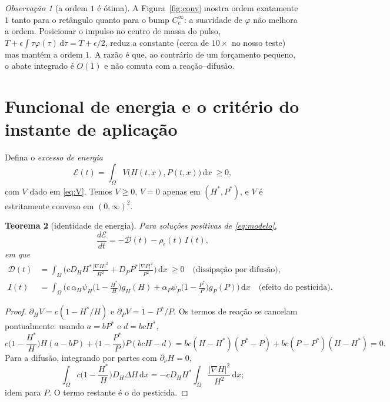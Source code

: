 \documentclass[11pt,a4paper]{article}
\numberwithin{equation}{section}
\newtheorem{teorema}{Teorema}[section]
\theoremstyle{definition}
\theoremstyle{remark}
\newtheorem{observacao}[teorema]{Observação}
\newcommand{\E}{\mathcal{E}}
\newcommand{\dd}{\,\mathrm{d}}
\newcommand{\Hs}{H^{*}}
\newcommand{\Ps}{P^{*}}
\begin{document}
\begin{observacao}[a ordem $1$ é ótima]\label{obs:ordem}
A Figura~\ref{fig:conv} mostra ordem exatamente $1$ tanto para o retângulo quanto para o bump
$C^\infty_c$: a suavidade de $\varphi$ não melhora a ordem. Posicionar o impulso no centro de
massa do pulso, $T+\epsilon\int\tau\varphi(\tau)\dd\tau=T+\epsilon/2$, reduz a constante (cerca
de $10\times$ no nosso teste) mas mantém a ordem $1$. A razão é que, ao contrário de um forçamento
pequeno, o abate integrado é $O(1)$ e não comuta com a reação--difusão.
\end{observacao}

\section{Funcional de energia e o critério do instante de aplicação}

Defina o \emph{excesso de energia}
\begin{equation}\label{eq:energia}
\E(t)=\int_\Omega V\big(H(t,x),P(t,x)\big)\dd x\ \ge0,
\end{equation}
com $V$ dado em \eqref{eq:V}. Temos $V\ge0$, $V=0$ apenas em $(\Hs,\Ps)$, e $V$ é
estritamente convexo em $(0,\infty)^2$.

\begin{teorema}[identidade de energia]\label{teo:energia}
Para soluções positivas de \eqref{eq:modelo},
\begin{equation}\label{eq:identidade}
\frac{d\E}{dt}=-\mathcal D(t)-\rho_\epsilon(t)\,I(t),
\end{equation}
em que
\begin{align*}
\mathcal D(t)&=\int_\Omega\Big(cD_H\Hs\frac{|\nabla H|^2}{H^2}+D_P\Ps\frac{|\nabla P|^2}{P^2}\Big)\dd x\ \ge0
\quad\text{(dissipação por difusão)},\\
I(t)&=\int_\Omega\Big(c\,\alpha_H\psi_H\Big(1-\frac{\Hs}{H}\Big)g_H(H)
+\alpha_P\psi_P\Big(1-\frac{\Ps}{P}\Big)g_P(P)\Big)\dd x
\quad\text{(efeito do pesticida)}.
\end{align*}
\end{teorema}

\begin{proof}
$\partial_HV=c(1-\Hs/H)$ e $\partial_PV=1-\Ps/P$. Os termos de reação se cancelam pontualmente:
usando $a=b\Ps$ e $d=bc\Hs$,
\[
c\Big(1-\frac{\Hs}{H}\Big)H(a-bP)+\Big(1-\frac{\Ps}{P}\Big)P(bcH-d)
=bc(H-\Hs)(\Ps-P)+bc(P-\Ps)(H-\Hs)=0 .
\]
Para a difusão, integrando por partes com $\partial_\nu H=0$,
\[\int_\Omega c\Big(1-\frac{\Hs}{H}\Big)D_H\Delta H\dd x=-cD_H\Hs\int_\Omega\frac{|\nabla H|^2}{H^2}\dd x;\]
idem para $P$. O termo
restante é o do pesticida.
\end{proof}
\end{document}
